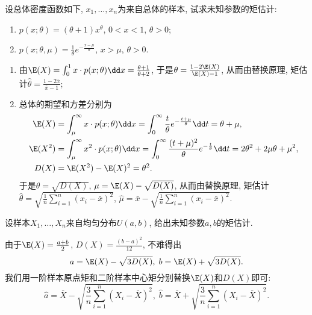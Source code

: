 \documentclass[11pt]{ctexart}
\begin{document}
\begin{example}
	设总体密度函数如下, $x_1, \dots, x_n$为来自总体的样本, 试求未知参数的矩估计: 
	\begin{enumerate}[label = (\arabic*)]
		\item $p(x;\theta) = (\theta+1) x^{\theta}$, $0<x<1$, $\theta > 0$; 
		\item $p(x; \theta, \mu) = \frac{1}{\theta} e^{- \frac{x - \mu}{\theta}}$, $x > \mu$, $\theta > 0$. 
	\end{enumerate}
\end{example}
\begin{solution}
	\begin{enumerate}[label = (\arabic*)]
		\item 由$\E(X) = \int_0^1 x \cdot p(x;\theta) \dd x = \frac{\theta+1}{\theta+2}$, 于是$\theta = \frac{1-2 \E(X)}{\E(X) - 1}$, 从而由替换原理, 矩估计$\hat \theta = \frac{1-2 \bar x}{\bar x - 1}$; 
		\item 总体的期望和方差分别为
			\begin{align*}
				\E(X) 
				&= \int_{\mu}^{\infty} x \cdot p(x;\theta) \dd x
				= \int_0^{\infty} \frac{t}{\theta} e^{-\frac{t + \mu}{\theta}} \dd t 
				= \theta + \mu, \\
				\E(X^2)
				&= \int_{\mu}^{\infty} x^2 \cdot p(x;\theta) \dd x
				= \int_0^{\infty} \frac{(t+\mu)^2}{\theta} e^{-\frac{t}{\theta}} \dd t
				= 2 \theta^2 + 2 \mu \theta + \mu^2, \\
				D(X)
				&= \E(X^2) - \E(X)^2
				= \theta^2. 
			\end{align*}
			于是$\theta = \sqrt{D(X)}$, $\mu = \E(X) - \sqrt{D(X)}$, 从而由替换原理, 矩估计$\hat \theta = \sqrt{\frac{1}{n} \sum_{i=1}^n (x_i - \bar x)^2}$, $\hat \mu = \bar x -  \sqrt{\frac{1}{n} \sum_{i=1}^n (x_i - \bar x)^2}$. 
	\end{enumerate}
\end{solution}


\begin{example}[均匀分布的矩估计]
	设样本$X_1, \dots, X_n$来自均匀分布$U(a, b)$, 给出未知参数$a, b$的矩估计. 
\end{example}
\begin{solution}
	由于$\E(X) = \frac{a+b}{2}$, $D(X) = \frac{(b-a)^2}{12}$, 不难得出
	\begin{equation*}
		a = \E(X) - \sqrt{3 D(X)},\;
		b = \E(X) + \sqrt{3 D(X)}. 
	\end{equation*}
	我们用一阶样本原点矩和二阶样本中心矩分别替换$\E(X)$和$D(X)$即可:
	\begin{equation*}
		\hat a = \overline X - \sqrt{\frac{3}{n} \sum_{i=1}^n (X_i - \overline X)^2},\; 
		\hat b = \overline X + \sqrt{\frac{3}{n} \sum_{i=1}^n (X_i - \overline X)^2}. 
	\end{equation*}
\end{solution}
\end{document}
